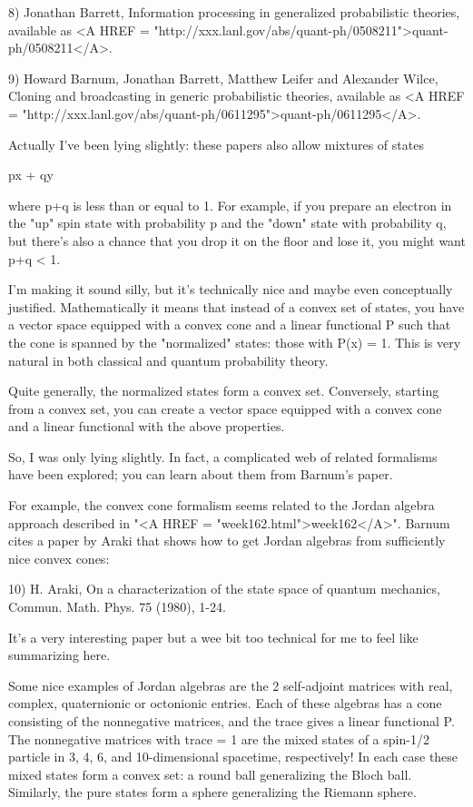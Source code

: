 8) Jonathan Barrett, Information processing in generalized 
probabilistic theories, available as <A HREF = "http://xxx.lanl.gov/abs/quant-ph/0508211">quant-ph/0508211</A>.

9) Howard Barnum, Jonathan Barrett, Matthew Leifer and Alexander Wilce,
Cloning and broadcasting in generic probabilistic theories, 
available as <A HREF = "http://xxx.lanl.gov/abs/quant-ph/0611295">quant-ph/0611295</A>.

Actually I've been lying slightly: these papers also allow mixtures
of states

px + qy

where p+q is less than or equal to 1.   For example, if you prepare 
an electron in the "up" spin state with probability p and the 
"down" state with probability q, but there's also a chance that you
drop it on the floor and lose it, you might want p+q < 1.

I'm making it sound silly, but it's technically nice and maybe even 
conceptually justified.   Mathematically it means that instead 
of a convex set of states, you have a vector space equipped with 
a convex cone and a linear functional P such that the cone is 
spanned by the "normalized" states: those with P(x) = 1.  This
is very natural in both classical and quantum probability theory.

Quite generally, the normalized states form a convex set.  
Conversely, starting from a convex set, you can create a vector 
space equipped with a convex cone and a linear functional with 
the above properties. 

So, I was only lying slightly.  In fact, a complicated 
web of related formalisms have been explored; you can learn 
about them from Barnum's paper. 

For example, the convex cone formalism seems related to the Jordan
algebra approach described in "<A HREF =
"week162.html">week162</A>".  Barnum cites a paper by Araki that
shows how to get Jordan algebras from sufficiently nice convex cones:

10) H. Araki, On a characterization of the state space of quantum
mechanics, Commun. Math. Phys. 75 (1980), 1-24.

It's a very interesting paper but a wee bit too technical for me to
feel like summarizing here.

Some nice examples of Jordan algebras are the 2 self-adjoint matrices 
with real, complex, quaternionic or octonionic entries.  Each of these 
algebras has a cone consisting of the nonnegative matrices, and the trace 
gives a linear functional P.  The nonnegative matrices with trace = 1 
are the mixed states of a spin-1/2 particle in 3, 4, 6, and 10-dimensional 
spacetime, respectively!  In each case these mixed states form a convex 
set: a round ball generalizing the Bloch ball.  Similarly, the pure states 
form a sphere generalizing the Riemann sphere.

